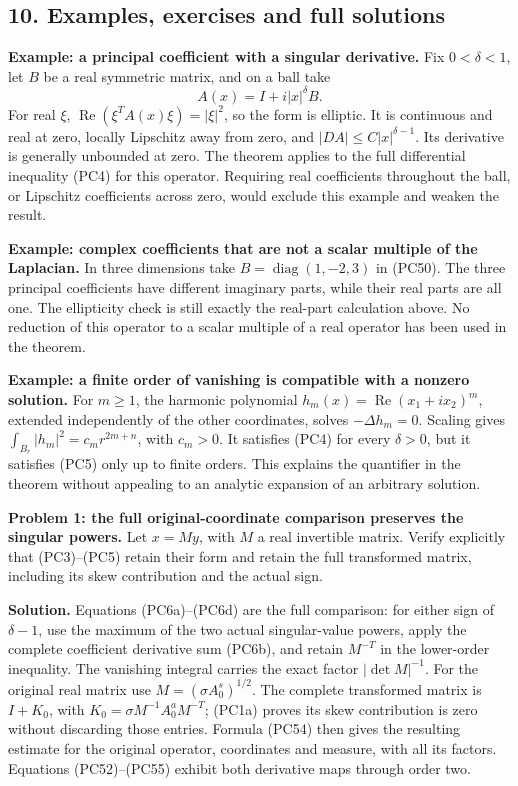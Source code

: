 \documentclass[
  11pt,
]{article}
\begin{document}
\subsection{10. Examples, exercises and full
solutions}\label{examples-exercises-and-full-solutions}

\textbf{Example: a principal coefficient with a singular derivative.}
Fix \(0<\delta<1\), let \(B\) be a real symmetric matrix, and on a ball
take \[
A(x)=I+i|x|^\delta B.
\tag{PC50}
\] For real \(\xi\), \(\operatorname{Re}(\xi^TA(x)\xi)=|\xi|^2\), so the
form is elliptic. It is continuous and real at zero, locally Lipschitz
away from zero, and \(|DA|\leq C|x|^{\delta-1}\). Its derivative is
generally unbounded at zero. The theorem applies to the full
differential inequality (PC4) for this operator. Requiring real
coefficients throughout the ball, or Lipschitz coefficients across zero,
would exclude this example and weaken the result.

\textbf{Example: complex coefficients that are not a scalar multiple of
the Laplacian.} In three dimensions take
\(B=\operatorname{diag}(1,-2,3)\) in (PC50). The three principal
coefficients have different imaginary parts, while their real parts are
all one. The ellipticity check is still exactly the real-part
calculation above. No reduction of this operator to a scalar multiple of
a real operator has been used in the theorem.

\textbf{Example: a finite order of vanishing is compatible with a
nonzero solution.} For \(m\geq1\), the harmonic polynomial
\(h_m(x)=\operatorname{Re}(x_1+ix_2)^m\), extended independently of the
other coordinates, solves \(-\Delta h_m=0\). Scaling gives
\(\int_{B_r}|h_m|^2=c_mr^{2m+n}\), with \(c_m>0\). It satisfies (PC4)
for every \(\delta>0\), but it satisfies (PC5) only up to finite orders.
This explains the quantifier in the theorem without appealing to an
analytic expansion of an arbitrary solution.

\textbf{Problem 1: the full original-coordinate comparison preserves the
singular powers.} Let \(x=My\), with \(M\) a real invertible matrix.
Verify explicitly that (PC3)--(PC5) retain their form and retain the
full transformed matrix, including its skew contribution and the actual
sign.

\textbf{Solution.} Equations (PC6a)--(PC6d) are the full comparison: for
either sign of \(\delta-1\), use the maximum of the two actual
singular-value powers, apply the complete coefficient derivative sum
(PC6b), and retain \(M^{-T}\) in the lower-order inequality. The
vanishing integral carries the exact factor \(|\det M|^{-1}\). For the
original real matrix use \(M=(\sigma A_0^s)^{1/2}\). The complete
transformed matrix is \(I+K_0\), with \(K_0=\sigma M^{-1}A_0^aM^{-T}\);
(PC1a) proves its skew contribution is zero without discarding those
entries. Formula (PC54) then gives the resulting estimate for the
original operator, coordinates and measure, with all its factors.
Equations (PC52)--(PC55) exhibit both derivative maps through order two.
\end{document}
